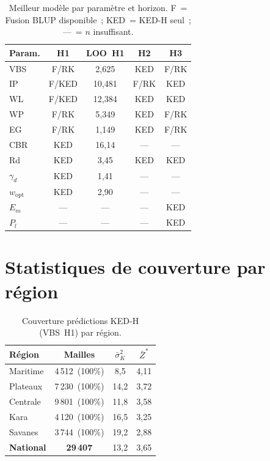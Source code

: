 \documentclass[10pt,a4paper,twocolumn]{article}
\begin{document}
	\begin{table}[H]
		\centering\small
		\caption{Meilleur modèle par paramètre et horizon.
			F~= Fusion BLUP disponible~;
			KED~= KED-H seul~;
			---~= $n$ insuffisant.}
		\label{tab:best_model_ext}
		\setlength{\tabcolsep}{3pt}
		\begin{tabular}{lcccc}
			\toprule
			Param. & H1 & LOO~H1 & H2 & H3 \\
			\midrule
			VBS  & F/RK  & 2,625  & KED & F/RK \\
			IP   & F/KED & 10,481 & F/RK & KED \\
			WL   & F/KED & 12,384 & KED & KED  \\
			WP   & F/RK  & 5,349  & KED & F/RK \\
			EG   & F/RK  & 1,149  & KED & F/RK \\
			CBR  & KED   & 16,14  & --- & ---  \\
			Rd   & KED   & 3,45   & KED & KED  \\
			$\gamma_d$ & KED & 1,41 & --- & --- \\
			$w_{\mathrm{opt}}$ & KED & 2,90 & --- & --- \\
			$E_m$ & ---  & ---    & --- & KED  \\
			$P_l$ & ---  & ---    & --- & KED  \\
			\bottomrule
		\end{tabular}
	\end{table}
	
	\section{Statistiques de couverture par région}
	\label{app:couverture}
	
	\begin{table}[H]
		\centering\small
		\caption{Couverture prédictions KED-H (VBS~H1) par région.}
		\label{tab:couverture_region}
		\begin{tabular}{lccc}
			\toprule
			Région & Mailles & $\bar{\sigma}^2_K$ & $\bar{Z}^*$ \\
			\midrule
			Maritime  & 4\,512~(100\%) & 8,5  & 4,11 \\
			Plateaux  & 7\,230~(100\%) & 14,2 & 3,72 \\
			Centrale  & 9\,801~(100\%) & 11,8 & 3,58 \\
			Kara      & 4\,120~(100\%) & 16,5 & 3,25 \\
			Savanes   & 3\,744~(100\%) & 19,2 & 2,88 \\
			\textbf{National} & \textbf{29\,407} & 13,2 & 3,65 \\
			\bottomrule
		\end{tabular}
	\end{table}
	
\end{document}
